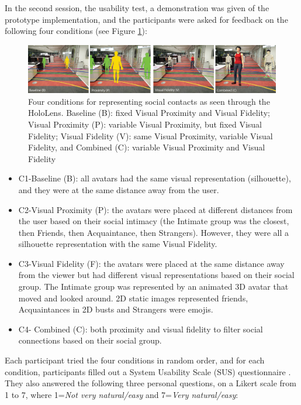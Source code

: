 In the second session, the usability test, a demonstration was given of the prototype implementation, and the participants were asked for feedback on the following four conditions (see Figure \ref{fig:contacts:conditions}): 
\begin{figure}[ht]
    \centering
    \includegraphics[width=\linewidth]{images/41-visualising-mgia17/conditions-transparent-background}
    \caption{Four conditions for representing social contacts as seen through the HoloLens. Baseline (B): fixed Visual Proximity and Visual Fidelity; Visual Proximity (P): variable Visual Proximity, but fixed Visual Fidelity; Visual Fidelity (V): same Visual Proximity, variable Visual Fidelity, and Combined (C): variable Visual Proximity and Visual Fidelity}
    \label{fig:contacts:conditions}
\end{figure}

\begin{itemize}
    \item{C1-Baseline (B): all avatars had the same visual representation (silhouette), and they were at the same distance away from the user.}
    
    \item{C2-Visual Proximity (P): the avatars were placed at different distances from the user based on their social intimacy (the Intimate group was the closest, then Friends, then Acquaintance, then Strangers). However, they were all a silhouette representation with the same Visual Fidelity.}
    
    \item{C3-Visual Fidelity (F): the avatars were placed at the same distance away from the viewer but had different visual representations based on their social group. The Intimate group was represented by an animated 3D avatar that moved and looked around. 2D static images represented friends, Acquaintances in 2D busts and Strangers were emojis.
    }
    \item{C4- Combined (C): both proximity and visual fidelity to filter social connections based on their social group.}

\end{itemize}

Each participant tried the four conditions in random order, and for each condition, participants filled out a System Usability Scale (SUS) questionnaire \cite{brooke1996sus}. They also answered the following three personal questions, on a Likert scale from 1 to 7, where 1=\textit{Not very natural/easy} and 7=\textit{Very natural/easy}:

